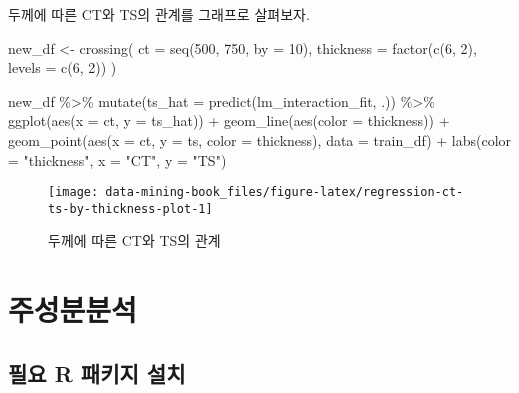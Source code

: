 \documentclass[
]{book}
\newenvironment{Shaded}{\begin{snugshade}}{\end{snugshade}}
\newcommand{\AttributeTok}[1]{\textcolor[rgb]{0.77,0.63,0.00}{#1}}
\newcommand{\DecValTok}[1]{\textcolor[rgb]{0.00,0.00,0.81}{#1}}
\newcommand{\FunctionTok}[1]{\textcolor[rgb]{0.00,0.00,0.00}{#1}}
\newcommand{\NormalTok}[1]{#1}
\newcommand{\OtherTok}[1]{\textcolor[rgb]{0.56,0.35,0.01}{#1}}
\newcommand{\SpecialCharTok}[1]{\textcolor[rgb]{0.00,0.00,0.00}{#1}}
\newcommand{\StringTok}[1]{\textcolor[rgb]{0.31,0.60,0.02}{#1}}
\begin{document}
두께에 따른 CT와 TS의 관계를 그래프로 살펴보자.

\begin{Shaded}
\begin{Highlighting}[]
\NormalTok{new\_df }\OtherTok{\textless{}{-}} \FunctionTok{crossing}\NormalTok{(}
  \AttributeTok{ct =} \FunctionTok{seq}\NormalTok{(}\DecValTok{500}\NormalTok{, }\DecValTok{750}\NormalTok{, }\AttributeTok{by =} \DecValTok{10}\NormalTok{),}
  \AttributeTok{thickness =} \FunctionTok{factor}\NormalTok{(}\FunctionTok{c}\NormalTok{(}\DecValTok{6}\NormalTok{, }\DecValTok{2}\NormalTok{), }\AttributeTok{levels =} \FunctionTok{c}\NormalTok{(}\DecValTok{6}\NormalTok{, }\DecValTok{2}\NormalTok{))}
\NormalTok{)}

\NormalTok{new\_df }\SpecialCharTok{\%\textgreater{}\%}
  \FunctionTok{mutate}\NormalTok{(}\AttributeTok{ts\_hat =} \FunctionTok{predict}\NormalTok{(lm\_interaction\_fit, .)) }\SpecialCharTok{\%\textgreater{}\%}
  \FunctionTok{ggplot}\NormalTok{(}\FunctionTok{aes}\NormalTok{(}\AttributeTok{x =}\NormalTok{ ct, }\AttributeTok{y =}\NormalTok{ ts\_hat)) }\SpecialCharTok{+}
  \FunctionTok{geom\_line}\NormalTok{(}\FunctionTok{aes}\NormalTok{(}\AttributeTok{color =}\NormalTok{ thickness)) }\SpecialCharTok{+}
  \FunctionTok{geom\_point}\NormalTok{(}\FunctionTok{aes}\NormalTok{(}\AttributeTok{x =}\NormalTok{ ct, }\AttributeTok{y =}\NormalTok{ ts, }\AttributeTok{color =}\NormalTok{ thickness), }\AttributeTok{data =}\NormalTok{ train\_df) }\SpecialCharTok{+}
  \FunctionTok{labs}\NormalTok{(}\AttributeTok{color =} \StringTok{"thickness"}\NormalTok{, }\AttributeTok{x =} \StringTok{"CT"}\NormalTok{, }\AttributeTok{y =} \StringTok{"TS"}\NormalTok{)}
\end{Highlighting}
\end{Shaded}

\begin{figure}

{\centering \texttt{[image: data-mining-book\_files/figure-latex/regression-ct-ts-by-thickness-plot-1]} 

}

\caption{두께에 따른 CT와 TS의 관계}\label{fig:regression-ct-ts-by-thickness-plot}
\end{figure}

\hypertarget{pca}{%
\chapter{주성분분석}\label{pca}}

\hypertarget{pca-packages-install}{%
\section{필요 R 패키지 설치}\label{pca-packages-install}}
\end{document}
